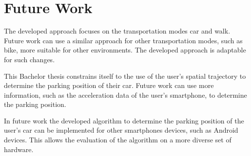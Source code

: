\section{Future Work}
The developed approach focuses on the transportation modes car and walk. Future work can use a similar approach for other transportation modes, such as bike, more suitable for other environments. The developed approach is adaptable for such changes. 

This Bachelor thesis constrains itself to the use of the user's spatial trajectory to determine the parking position of their car. Future work can use more information, such as the acceleration data of the user's smartphone, to determine the parking position. 

In future work the developed algorithm to determine the parking position of the user's car can be implemented for other smartphones devices, such as Android devices. This allows the evaluation of the algorithm on a more diverse set of hardware. 

